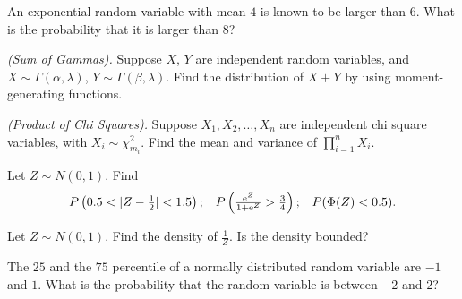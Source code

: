 \begin{problem}[Handout 13, \# 17]
  An exponential random variable with mean \(4\) is known to be larger than
  \(6\). What is the probability that it is larger than \(8\)?
\end{problem}
\begin{solution*}

\end{solution*}

\begin{problem}[Handout 13, \# 18]
  \emph{(Sum of Gammas).} Suppose \(X\), \(Y\) are independent random
  variables, and \(X\sim \Gamma(\alpha,\lambda)\),
  \(Y\sim \Gamma(\beta,\lambda)\). Find the distribution of \(X+Y\) by
  using moment-generating functions.
\end{problem}
\begin{solution*}

\end{solution*}

\begin{problem}[Handout 13, \# 19]
  \emph{(Product of Chi Squares).} Suppose \(X_1,X_2,\dotsc,X_n\) are
  independent chi square variables, with \(X_i\sim\chi_{m_i}^2\). Find the
  mean and variance of \(\prod_{i=1}^n X_i\).
\end{problem}
\begin{solution*}

\end{solution*}

\begin{problem}[Handout 13, \# 20]
  Let \(Z\sim N(0,1)\). Find
  \[
    \begin{aligned}
      P\left( 0.5<|Z-\tfrac{1}{2}|<1.5\right);
      && P\left(\tfrac{\rme^Z}{1+\rme^Z}>\tfrac{3}{4}\right);
      &&P(\Phi(Z)<0.5).
    \end{aligned}
  \]
\end{problem}
\begin{solution*}

\end{solution*}

\begin{problem}[Handout 13, \# 21]
  Let \(Z\sim N(0,1)\). Find the density of \(\frac{1}{Z}\). Is the density
  bounded?
\end{problem}
\begin{solution*}

\end{solution*}

\begin{problem}[Handout 13, \# 22]
  The \(25\) and the \(75\) percentile of a
  normally distributed random variable are \(-1\) and \(1\). What is the
  probability that the random variable is between \(-2\) and \(2\)?
\end{problem}
\begin{solution*}

\end{solution*}

